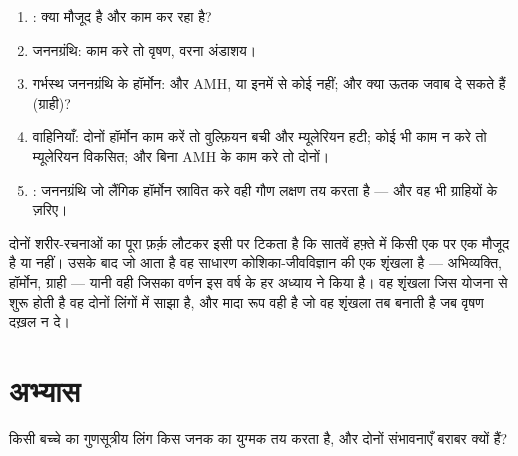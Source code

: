 \begin{method}[किसी मामले पर तर्क करना]\label{met:g11:becoming-male-female:case}
\begin{enumerate}
  \item {}: क्या  मौजूद है और काम कर रहा है?
  \item जननग्रंथि:  काम करे तो वृषण, वरना अंडाशय।
  \item गर्भस्थ जननग्रंथि के हॉर्मोन:  और AMH, या इनमें से
        कोई नहीं; और क्या ऊतक जवाब दे सकते हैं (ग्राही)?
  \item वाहिनियाँ: दोनों हॉर्मोन काम करें तो वुल्फ़ियन बची और म्यूलेरियन
        हटी; कोई भी काम न करे तो म्यूलेरियन विकसित; और  बिना
        AMH के काम करे तो दोनों।
  \item {}: जननग्रंथि जो लैंगिक हॉर्मोन स्रावित करे वही गौण लक्षण तय
        करता है --- और वह भी ग्राहियों के ज़रिए।
\end{enumerate}
\end{method}

\begin{remark}[एक जीन, और उसके बाद सब कुछ]\label{rem:g11:becoming-male-female:onegene}
दोनों शरीर-रचनाओं का पूरा फ़र्क़ लौटकर इसी पर टिकता है कि सातवें हफ़्ते में
किसी एक  पर एक  मौजूद है या नहीं। उसके बाद जो आता है वह साधारण
कोशिका-जीवविज्ञान की एक शृंखला है ---  अभिव्यक्ति, हॉर्मोन, ग्राही ---
यानी वही जिसका वर्णन इस वर्ष के हर अध्याय ने किया है। वह शृंखला जिस योजना
से शुरू होती है वह दोनों लिंगों में साझा है, और मादा रूप वही है जो वह
शृंखला तब बनाती है जब वृषण दख़ल न दे।
\end{remark}

\section{अभ्यास}

\begin{exercise}[$\star$]\label{exo:g11:becoming-male-female:1}
किसी बच्चे का गुणसूत्रीय लिंग किस जनक का युग्मक तय करता है, और दोनों
संभावनाएँ बराबर क्यों हैं?
\end{exercise}

